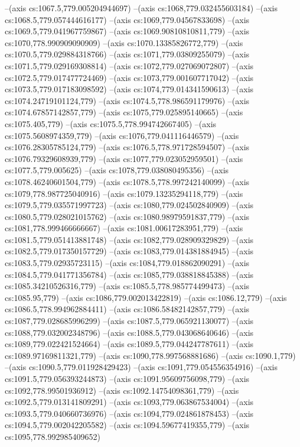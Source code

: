 --(axis cs:1067.5,779.005204944697)
--(axis cs:1068,779.032455603184)
--(axis cs:1068.5,779.057444616177)
--(axis cs:1069,779.04567833698)
--(axis cs:1069.5,779.041967759867)
--(axis cs:1069.90810810811,779)
--(axis cs:1070,778.990909090909)
--(axis cs:1070.13385826772,779)
--(axis cs:1070.5,779.029884318766)
--(axis cs:1071,779.03809255079)
--(axis cs:1071.5,779.029169308814)
--(axis cs:1072,779.027069072807)
--(axis cs:1072.5,779.017477724469)
--(axis cs:1073,779.001607717042)
--(axis cs:1073.5,779.017183098592)
--(axis cs:1074,779.014341590613)
--(axis cs:1074.24719101124,779)
--(axis cs:1074.5,778.986591179976)
--(axis cs:1074.67857142857,779)
--(axis cs:1075,779.025895140665)
--(axis cs:1075.405,779)
--(axis cs:1075.5,778.994742667405)
--(axis cs:1075.5608974359,779)
--(axis cs:1076,779.041116446579)
--(axis cs:1076.28305785124,779)
--(axis cs:1076.5,778.971728594507)
--(axis cs:1076.79329608939,779)
--(axis cs:1077,779.023052959501)
--(axis cs:1077.5,779.005625)
--(axis cs:1078,779.038080495356)
--(axis cs:1078.46240601504,779)
--(axis cs:1078.5,778.997242140099)
--(axis cs:1079,778.987725040916)
--(axis cs:1079.13235294118,779)
--(axis cs:1079.5,779.035571997723)
--(axis cs:1080,779.024502840909)
--(axis cs:1080.5,779.028021015762)
--(axis cs:1080.98979591837,779)
--(axis cs:1081,778.999466666667)
--(axis cs:1081.00617283951,779)
--(axis cs:1081.5,779.051413881748)
--(axis cs:1082,779.028909329829)
--(axis cs:1082.5,779.017350157729)
--(axis cs:1083,779.014381884945)
--(axis cs:1083.5,779.02935723115)
--(axis cs:1084,779.018862090291)
--(axis cs:1084.5,779.041771356784)
--(axis cs:1085,779.038818845388)
--(axis cs:1085.34210526316,779)
--(axis cs:1085.5,778.985774499473)
--(axis cs:1085.95,779)
--(axis cs:1086,779.002013422819)
--(axis cs:1086.12,779)
--(axis cs:1086.5,778.994962884411)
--(axis cs:1086.58482142857,779)
--(axis cs:1087,779.028685996299)
--(axis cs:1087.5,779.065921130077)
--(axis cs:1088,779.032002348796)
--(axis cs:1088.5,779.043068640646)
--(axis cs:1089,779.022421524664)
--(axis cs:1089.5,779.044247787611)
--(axis cs:1089.97169811321,779)
--(axis cs:1090,778.997568881686)
--(axis cs:1090.1,779)
--(axis cs:1090.5,779.011928429423)
--(axis cs:1091,779.054556354916)
--(axis cs:1091.5,779.056393244873)
--(axis cs:1091.95609756098,779)
--(axis cs:1092,778.99501936912)
--(axis cs:1092.14754098361,779)
--(axis cs:1092.5,779.013141809291)
--(axis cs:1093,779.063867534004)
--(axis cs:1093.5,779.040660736976)
--(axis cs:1094,779.024861878453)
--(axis cs:1094.5,779.002042205582)
--(axis cs:1094.59677419355,779)
--(axis cs:1095,778.992985409652)
